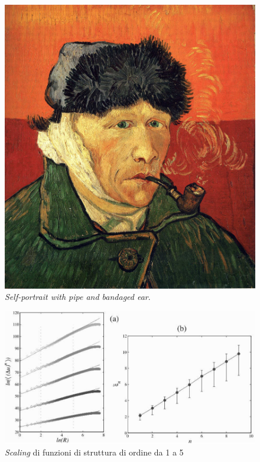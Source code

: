 \documentclass[12pt,a4paper]{article}
\numberwithin{equation}{section}
\begin{document}
\begin{figure}
    \centering
    \includegraphics[scale=0.12]{selfportrait.jpg}
    \caption{\emph{Self-portrait with pipe and bandaged ear}.}
    \label{self}
\end{figure}

\begin{figure}
    \centering
    \includegraphics[scale=0.3]{scalingpower.png}
    \caption{\emph{Scaling} di funzioni di struttura di ordine da 1 a 5}
    \label{scalingpower}
\end{figure}
\end{document}
